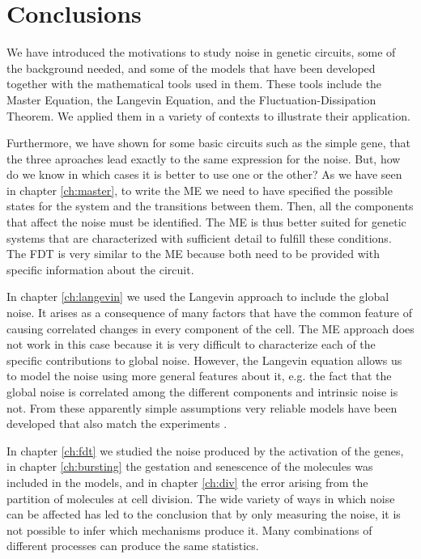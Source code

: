 \chapter*{Conclusions}

We have introduced the motivations to study noise in genetic circuits, some of the background needed, and some of the models that have been developed together with the mathematical tools used in them. These tools include the Master Equation, the Langevin Equation, and the Fluctuation-Dissipation Theorem. We applied them in a variety of contexts to illustrate their application.

Furthermore, we have shown for some basic circuits such as the simple gene, that the three aproaches lead exactly to the same expression for the noise. But, how do we know in which cases it is better to use one or the other? As we have seen in chapter \ref{ch:master}, to write the ME we need to have specified the possible states for the system and the transitions between them. Then, all the components that affect the noise must be identified. The ME is thus better suited for genetic systems that are characterized with sufficient detail to fulfill these conditions. The FDT is very similar to the ME because both need to be provided with specific information about the circuit.

In chapter \ref{ch:langevin} we used the Langevin approach to include the global noise. It arises as a consequence of many factors that have the common feature of causing correlated changes in every component of the cell. The ME approach does not work in this case because it is very difficult to characterize each of the specific contributions to global noise. However, the Langevin equation allows us to model the noise using more general features about it, e.g. the fact that the global noise is correlated among the different components and intrinsic noise is not. From these apparently simple assumptions very reliable models have been developed that also match the experiments \cite{pedraza05}.

In chapter \ref{ch:fdt} we studied the noise produced by the activation of the genes, in chapter \ref{ch:bursting} the gestation and senescence of the molecules was included in the models, and in chapter \ref{ch:div} the error arising from the partition of molecules at cell division. The wide variety of ways in which noise can be affected has led to the conclusion that by only measuring the noise, it is not possible to infer which mechanisms produce it. Many combinations of different processes can produce the same statistics.

